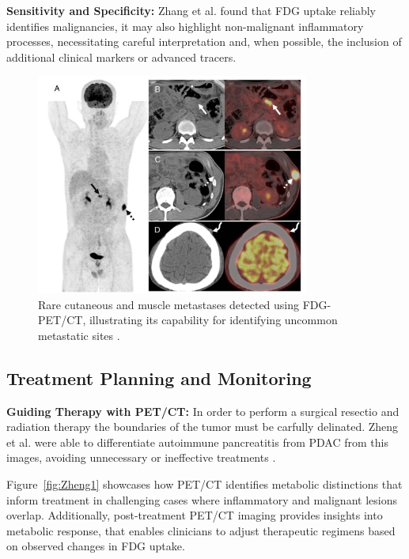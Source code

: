 \documentclass[11pt]{article} %
\begin{document}
\textbf{Sensitivity and Specificity:} Zhang et al. found that FDG uptake reliably identifies malignancies, it may also highlight non-malignant inflammatory processes, necessitating careful interpretation and, when possible, the inclusion of additional clinical markers or advanced tracers.

\begin{figure}[H]
    \centering
    \includegraphics[width=0.8\textwidth]{assets/Zhang1.png}
    \caption{Rare cutaneous and muscle metastases detected using FDG-PET/CT, illustrating its capability for identifying uncommon metastatic sites \cite{Zhang2023}.}
    \label{fig:Zhang1}
\end{figure}


\subsection{Treatment Planning and Monitoring}

\textbf{Guiding Therapy with PET/CT:} In order to perform a surgical resectio and radiation therapy the boundaries of the tumor must be carfully delinated. Zheng et al. were able to differentiate autoimmune pancreatitis from PDAC from this images, avoiding unnecessary or ineffective treatments \cite{Zheng2018}.


Figure~\ref{fig:Zheng1} showcases how PET/CT identifies metabolic distinctions that inform treatment in challenging cases where inflammatory and malignant lesions overlap. Additionally, post-treatment PET/CT imaging provides insights into metabolic response, that enables clinicians to adjust therapeutic regimens based on observed changes in FDG uptake.
\end{document}
